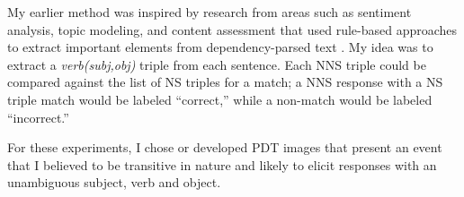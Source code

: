 My earlier method was inspired by research from areas such as sentiment analysis, topic modeling, and content assessment that used rule-based approaches to extract important elements from dependency-parsed text \citep{nastase2006,bailey:meurers:08,dicaro2013}. My idea was to extract a \textit{verb(subj,obj)} triple from each sentence. Each NNS triple could be compared against the list of NS triples for a match; a NNS response with a NS triple match would be labeled ``correct,'' while a non-match would be labeled ``incorrect.''

For these experiments, I chose or developed PDT images that present an event that I believed to be transitive in nature and likely to elicit responses with an unambiguous subject, verb and object.


